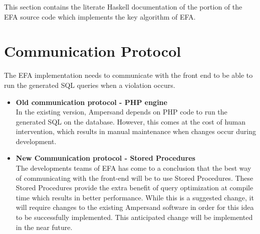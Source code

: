 This section contains the literate Haskell documentation of the portion 
of the EFA source code which implements the key algorithm of EFA. 



\section{Communication Protocol}
The EFA implementation needs to communicate with the front end to be able to 
run the generated SQL queries when a violation occurs. 
\begin{itemize}
    \item \textbf{Old communication protocol -  PHP engine} \\
    In the existing version, Ampersand depends on PHP code to run the 
    generated SQL on the database. However, this comes at the cost of 
    human intervention, which results in manual maintenance when 
    changes occur during development. 
    \item \textbf{New Communication protocol - Stored Procedures} \\
    The developments teams of EFA has come to a conclusion that the 
    best way of communicating with the front-end will be to use Stored 
    Procedures\cite{SP}. These Stored Procedures provide the extra 
    benefit of query optimization at compile time which results in 
    better performance. While this is a suggested change, it will 
    require changes to the existing Ampersand software in order for 
    this idea to be successfully implemented. This anticipated 
    change will be implemented in the near future.
    
\end{itemize}
